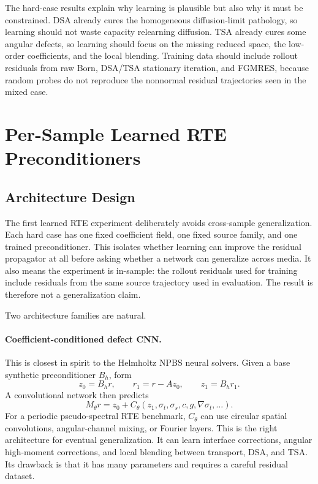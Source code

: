 \documentclass[11pt]{article}
\begin{document}
The hard-case results explain why learning is plausible but also why it must
be constrained. DSA already cures the homogeneous diffusion-limit pathology,
so learning should not waste capacity relearning diffusion. TSA already cures
some angular defects, so learning should focus on the missing reduced space,
the low-order coefficients, and the local blending. Training data should
include rollout residuals from raw Born, DSA/TSA stationary iteration, and
FGMRES, because random probes do not reproduce the nonnormal residual
trajectories seen in the mixed case.

\section{Per-Sample Learned RTE Preconditioners}

\subsection{Architecture Design}

The first learned RTE experiment deliberately avoids cross-sample
generalization.  Each hard case has one fixed coefficient field, one fixed
source family, and one trained preconditioner.  This isolates whether learning
can improve the residual propagator at all before asking whether a network can
generalize across media.
It also means the experiment is in-sample: the rollout residuals used for
training include residuals from the same source trajectory used in evaluation.
The result is therefore not a generalization claim.

Two architecture families are natural.

\paragraph{Coefficient-conditioned defect CNN.}
This is closest in spirit to the Helmholtz NPBS neural solvers.  Given a base
synthetic preconditioner \(B_h\), form
\[
  z_0=B_h r,\qquad r_1=r-Az_0,\qquad z_1=B_h r_1 .
\]
A convolutional network then predicts
\[
  M_\theta r
  =
  z_0+C_\theta(z_1,\sigma_t,\sigma_s,c,g,\nabla\sigma_t,\ldots).
\]
For a periodic pseudo-spectral RTE benchmark, \(C_\theta\) can use circular
spatial convolutions, angular-channel mixing, or Fourier layers.  This is the
right architecture for eventual generalization.  It can learn interface
corrections, angular high-moment corrections, and local blending between
transport, DSA, and TSA.  Its drawback is that it has many parameters and
requires a careful residual dataset.
\end{document}
